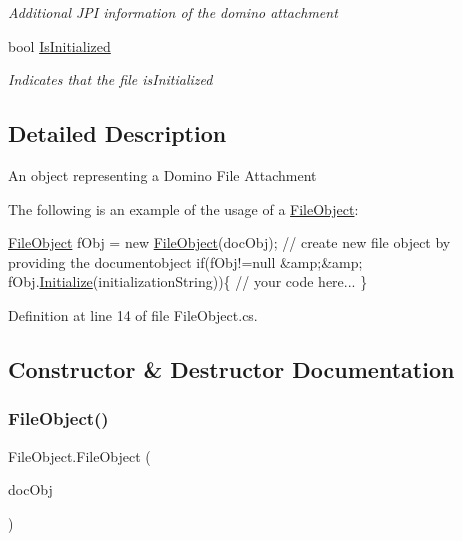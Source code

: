 \begin{DoxyCompactItemize}
\begin{DoxyCompactList}\small\item\em Additional J\+PI information of the domino attachment \end{DoxyCompactList}\item 
bool \mbox{\hyperlink{class_file_object_a36ff6c07d0662885402bfe7d98cf2988}{Is\+Initialized}}
\begin{DoxyCompactList}\small\item\em Indicates that the file is\+Initialized \end{DoxyCompactList}\end{DoxyCompactItemize}


\subsection{Detailed Description}
An object representing a Domino File Attachment 

The following is an example of the usage of a {\ttfamily \mbox{\hyperlink{class_file_object}{File\+Object}}}\+: 
\begin{DoxyCode}
\mbox{\hyperlink{class_file_object}{FileObject}} fObj = \textcolor{keyword}{new} \mbox{\hyperlink{class_file_object_a0820c64117f9bcebf4ac750fbb320295}{FileObject}}(docObj); \textcolor{comment}{// create new file object by providing the
       documentobject}
\textcolor{keywordflow}{if}(fObj!=null &amp;&amp; fObj.\mbox{\hyperlink{class_file_object_a1d371eb0e306cda4b80d2e8d32e987e0}{Initialize}}(initializationString))\{ 
     \textcolor{comment}{// your code here... }
\}
\end{DoxyCode}
 

Definition at line 14 of file File\+Object.\+cs.



\subsection{Constructor \& Destructor Documentation}
\mbox{\label{class_file_object_a0820c64117f9bcebf4ac750fbb320295}} 
\subsubsection{\texorpdfstring{File\+Object()}{FileObject()}}
{\footnotesize\ttfamily File\+Object.\+File\+Object (\begin{DoxyParamCaption}\item[{\mbox{\hyperlink{class_document_object}{Document\+Object}}}]{doc\+Obj }\end{DoxyParamCaption})}



